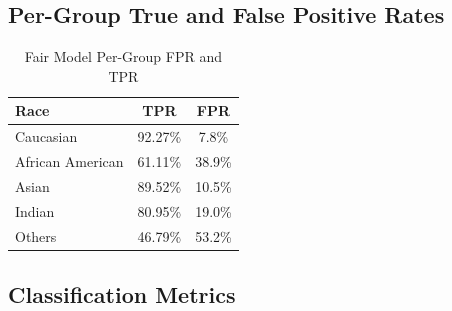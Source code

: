 \documentclass[11pt,a4paper,oneside]{report}
\begin{document}
\subsection{Per-Group True and False Positive Rates}

\begin{table}[h]

\centering

\caption{Fair Model Per-Group FPR and TPR}

\begin{tabular}{|l|c|c|}

\hline

\textbf{Race} & \textbf{TPR} & \textbf{FPR} \\

\hline

Caucasian & 92.27\% & 7.8\% \\

\hline

African American & 61.11\% & 38.9\% \\

\hline

Asian & 89.52\% & 10.5\% \\

\hline

Indian & 80.95\% & 19.0\% \\

\hline

Others & 46.79\% & 53.2\% \\

\hline

\end{tabular}

\end{table}

\subsection{Classification Metrics}
\end{document}
